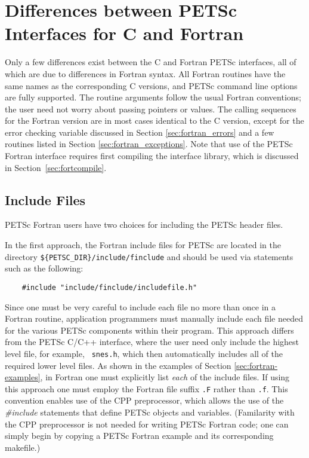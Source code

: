 \section{Differences between PETSc Interfaces for C and Fortran}

Only a few differences exist between the C and Fortran PETSc
interfaces, all of which are due to differences in Fortran syntax.
All Fortran routines have the same names as the corresponding C
versions, and PETSc command line options are fully supported. The
routine arguments follow the usual Fortran conventions; the user need
not worry about passing pointers or values.  The calling sequences
for the Fortran version are in most cases identical to the C version,
except for the error checking variable discussed in 
Section \ref{sec:fortran_errors} and a few routines listed in 
Section \ref{sec:fortran_exceptions}.
Note that use of the PETSc Fortran interface requires first compiling
the interface library, which is discussed in Section~\ref{sec:fortcompile}.

\subsection{Include Files}
\label{sec:fortran_includes}

PETSc Fortran users have two choices for including the PETSc header 
files. 

\medskip

In the first  approach, 
the Fortran include files for PETSc are located in the directory 
{\tt \$\{PETSC\_DIR\}/include/finclude} and should be used via statements 
such as the following:
\begin{verbatim}
    #include "include/finclude/includefile.h"
\end{verbatim}
Since one must be very careful to include each file no more than once
in a Fortran routine, application programmers must manually include
each file needed for the various PETSc components within their
program.  This approach differs from the PETSc C/C++ interface, where
the user need only include the highest level file, for example, {\tt
snes.h}, which then automatically includes all of the required lower
level files.  As shown in the examples of Section
\ref{sec:fortran-examples}, in Fortran one must explicitly list {\em
each} of the include files. If using this approach one must employ
the Fortran file suffix {\tt .F}
rather than {\tt .f}.  This convention enables use of the CPP
preprocessor, which allows the use of the {\em \#include} statements
that define PETSc objects and variables. (Familarity with the CPP
preprocessor is not needed for writing PETSc Fortran code; one can simply
begin by copying a PETSc Fortran example and its corresponding
makefile.)  

